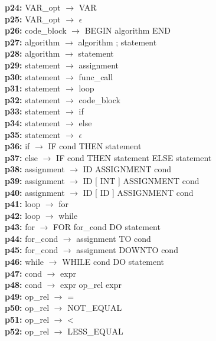 \documentclass[12pt,a4paper]{report}
\begin{document}
\begin{tabbing}
\textbf{p24:} \> VAR\_opt \(\to\) VAR \\
\textbf{p25:} \> VAR\_opt \(\to\) \(\epsilon\) \\
\textbf{p26:} \> code\_block \(\to\) BEGIN algorithm END \\
\textbf{p27:} \> algorithm \(\to\) algorithm ; statement \\
\textbf{p28:} \> algorithm \(\to\) statement \\
\textbf{p29:} \> statement \(\to\) assignment \\
\textbf{p30:} \> statement \(\to\) func\_call \\
\textbf{p31:} \> statement \(\to\) loop \\
\textbf{p32:} \> statement \(\to\) code\_block \\
\textbf{p33:} \> statement \(\to\) if \\
\textbf{p34:} \> statement \(\to\) else \\
\textbf{p35:} \> statement \(\to\) \(\epsilon\) \\
\textbf{p36:} \> if \(\to\) IF cond THEN statement \\
\textbf{p37:} \> else \(\to\) IF cond THEN statement ELSE statement \\
\textbf{p38:} \> assignment \(\to\) ID ASSIGNMENT cond \\
\textbf{p39:} \> assignment \(\to\) ID [ INT ] ASSIGNMENT cond \\
\textbf{p40:} \> assignment \(\to\) ID [ ID ] ASSIGNMENT cond \\
\textbf{p41:} \> loop \(\to\) for \\
\textbf{p42:} \> loop \(\to\) while \\
\textbf{p43:} \> for \(\to\) FOR for\_cond DO statement \\
\textbf{p44:} \> for\_cond \(\to\) assignment TO cond \\
\textbf{p45:} \> for\_cond \(\to\) assignment DOWNTO cond \\
\textbf{p46:} \> while \(\to\) WHILE cond DO statement \\
\textbf{p47:} \> cond \(\to\) expr \\
\textbf{p48:} \> cond \(\to\) expr op\_rel expr \\
\textbf{p49:} \> op\_rel \(\to\) = \\
\textbf{p50:} \> op\_rel \(\to\) NOT\_EQUAL \\
\textbf{p51:} \> op\_rel \(\to\) < \\
\textbf{p52:} \> op\_rel \(\to\) LESS\_EQUAL \\

\end{tabbing}
\end{document}
